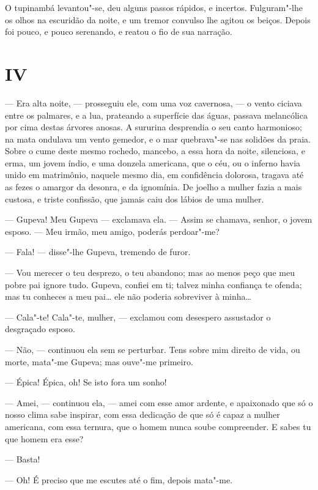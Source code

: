 O tupinambá levantou"-se, deu alguns passos rápidos, e incertos.
Fulguram"-lhe os olhos na escuridão da noite, e um tremor convulso lhe
agitou os beiços. Depois foi pouco, e pouco serenando, e reatou o fio de
sua narração.

\section*{IV}

--- Era alta noite, --- prosseguiu ele, com uma voz cavernosa, --- o vento
ciciava entre os palmares, e a lua, prateando a superfície das águas,
passava melancólica por cima destas árvores anosas. A sururina
desprendia o seu canto harmonioso; na mata ondulava um vento gemedor, e
o mar quebrava"-se nas solidões da praia. Sobre o cume deste mesmo
rochedo, mancebo, a essa hora da noite, silenciosa, e erma, um jovem
índio, e uma donzela americana, que o céu, ou o inferno havia unido em
matrimônio, naquele mesmo dia, em confidência dolorosa, tragava até as
fezes o amargor da desonra, e da ignomínia. De joelho a mulher fazia a
mais custosa, e triste confissão, que jamais caiu dos lábios de uma
mulher.

--- Gupeva! Meu Gupeva --- exclamava ela. --- Assim se chamava, senhor, o
jovem esposo. --- Meu irmão, meu amigo, poderás perdoar"-me?

--- Fala! --- disse"-lhe Gupeva, tremendo de furor.

--- Vou merecer o teu desprezo, o teu abandono; mas ao menos peço que
meu pobre pai ignore tudo. Gupeva, confiei em ti; talvez minha confiança
te ofenda; mas tu conheces a meu pai\ldots{} ele não poderia sobreviver à
minha\ldots{}

--- Cala"-te! Cala"-te, mulher, --- exclamou com desespero assustador o
desgraçado esposo.

--- Não, --- continuou ela sem se perturbar. Tens sobre mim direito de
vida, ou morte, mata"-me Gupeva; mas ouve"-me primeiro.

--- Épica! Épica, oh! Se isto fora um sonho!

--- Amei, --- continuou ela, --- amei com esse amor ardente, e apaixonado
que só o nosso clima sabe inspirar, com essa dedicação de que só é capaz
a mulher americana, com essa ternura, que o homem nunca soube
compreender. E sabes tu que homem era esse?

--- Basta!

--- Oh! É preciso que me escutes até o fim, depois mata"-me.

